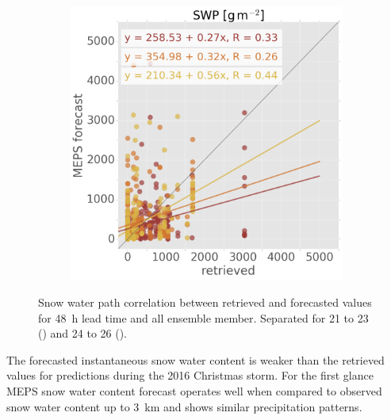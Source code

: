 \begin{figure}[ht!]
\begin{subfigure}[b]{0.49\textwidth}
		\includegraphics[width=\textwidth]{./fig_SWP_scat/EM09_20161224_26_00}
		\caption{}\label{fig:SWP:2426}
	\end{subfigure}
	\caption{Snow water path correlation between retrieved and forecasted values for \SI{48}{\hour} lead time and all ensemble member. Separated for \num{21} to \SI{23}{\dec} (\protect{}) and \num{24} to \SI{26}{\dec} (\protect{}).}\label{fig:SWP}
\end{figure}
\noindent
The forecasted instantaneous snow water content%
is weaker than the retrieved values for predictions during the 2016 Christmas storm.%
For the first glance MEPS snow water content forecast operates well when compared to observed snow water content up to \SI{3}{\km} and shows similar precipitation patterns. %
